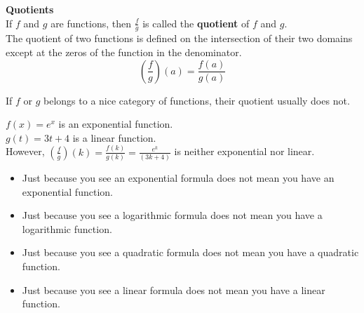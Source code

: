 \documentclass{ximera}
\begin{document}
\begin{template}  \textbf{\textcolor{blue!55!black}{Quotients}} \\


If  $f$ and $g$ are functions, then $\frac{f}{g}$ is called the \textbf{\textcolor{green!50!black}{quotient}} of $f$ and $g$. \\

The quotient of two functions is defined on the intersection of their two domains except at the zeros of the function in the denominator. \\


\[ \left(\frac{f}{g}\right)(a) = \frac{f(a)}{g(a)}  \]



\end{template}



\begin{warning}

If $f$ or $g$ belongs to a nice category of functions, their quotient usually does not.

\end{warning}





\begin{example}

$f(x) = e^x$ is an exponential function. \\
$g(t) = 3 t + 4$ is a linear function. \\

However, $\left(\frac{f}{g}\right)(k) = \frac{f(k)}{g(k)} = \frac{e^k}{(3 k + 4)}$ is neither exponential nor linear.

\end{example}











\begin{warning}


\begin{itemize}
\item Just because you see an exponential formula does not mean you have an exponential function. \\ 
\item Just because you see a logarithmic formula does not mean you have a logarithmic function. \\ 
\item Just because you see a quadratic formula does not mean you have a quadratic function. \\ 
\item Just because you see a linear formula does not mean you have a linear function. \\ 
\end{itemize}

\end{warning}
\end{document}
